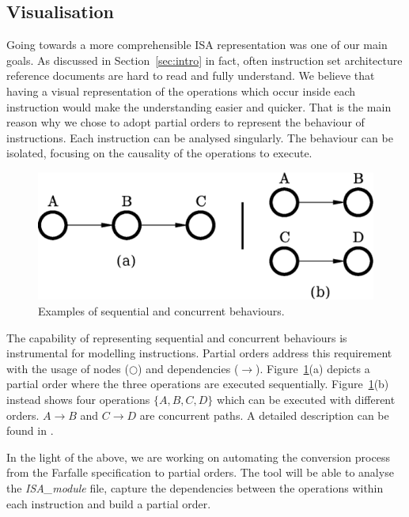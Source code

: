 \documentclass[conference]{IEEEtran}
\begin{document}
\subsection{Visualisation}
\label{sec:read}
Going towards a more comprehensible ISA representation was one of our main goals. As discussed in
Section~\ref{sec:intro} in fact, often instruction set architecture reference documents are hard to
read and fully understand. We believe that having a visual representation of the operations
which occur inside each instruction would make the understanding easier and quicker. That is
the main reason why we chose to adopt partial orders to represent the behaviour of
instructions. Each instruction can be analysed singularly. The behaviour can be isolated,
focusing on the causality of the operations to execute.

\begin{figure}[ht!]
\begin{center}
	\includegraphics[scale=0.5]{IMG/pos.eps}
	\caption{Examples of sequential and concurrent behaviours.}
	\label{fig:pos}
\end{center}
\end{figure}

The capability of representing sequential and concurrent behaviours is instrumental for
modelling instructions. Partial orders address this requirement with the usage of nodes
($\bigcirc$) and dependencies ($\rightarrow$). Figure~\ref{fig:pos}(a) depicts a partial order
where the three operations are executed sequentially. Figure~\ref{fig:pos}(b) instead shows
four operations $\lbrace A,B,C,D \rbrace$ which can be executed with different orders. 
$A \rightarrow B$ and $C \rightarrow D$ are concurrent paths. A detailed
description can be found in \cite{andreyPhd}.

In the light of the above, we are working on automating the conversion process from the
Farfalle specification to partial orders. The tool will be able to analyse the
\textit{ISA\_module} file, capture the dependencies between the operations within each
instruction and build a partial order. 
\end{document}
